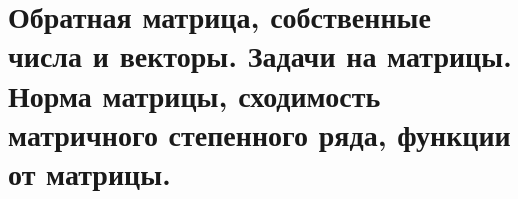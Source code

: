 \documentclass[../../calc-math-exam-2023.tex]{subfiles}
\begin{document}
    \section{Обратная матрица, собственные числа и векторы. Задачи на матрицы. Норма матрицы, сходимость матричного степенного ряда, функции от матрицы.}\label{sec:ch16}
\end{document}
